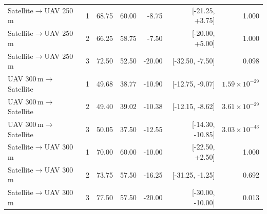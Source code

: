 \begin{table}[t]
{\begin{tabular}{lrrrrrr}
\addlinespace
Satellite$\rightarrow$UAV 250\,m & 1 & 68.75 & 60.00 & -8.75 & [-21.25, +3.75] & 1.000 \\
Satellite$\rightarrow$UAV 250\,m & 2 & 66.25 & 58.75 & -7.50 & [-20.00, +5.00] & 1.000 \\
Satellite$\rightarrow$UAV 250\,m & 3 & 72.50 & 52.50 & -20.00 & [-32.50, -7.50] & 0.098 \\
\addlinespace
UAV 300\,m$\rightarrow$Satellite & 1 & 49.68 & 38.77 & -10.90 & [-12.75, -9.07] & $1.59\times10^{-29}$ \\
UAV 300\,m$\rightarrow$Satellite & 2 & 49.40 & 39.02 & -10.38 & [-12.15, -8.62] & $3.61\times10^{-29}$ \\
UAV 300\,m$\rightarrow$Satellite & 3 & 50.05 & 37.50 & -12.55 & [-14.30, -10.85] & $3.03\times10^{-43}$ \\
\addlinespace
Satellite$\rightarrow$UAV 300\,m & 1 & 70.00 & 60.00 & -10.00 & [-22.50, +2.50] & 1.000 \\
Satellite$\rightarrow$UAV 300\,m & 2 & 73.75 & 57.50 & -16.25 & [-31.25, -1.25] & 0.692 \\
Satellite$\rightarrow$UAV 300\,m & 3 & 77.50 & 57.50 & -20.00 & [-30.00, -10.00] & 0.013 \\
\bottomrule
\end{tabular}%
}
\end{table}
